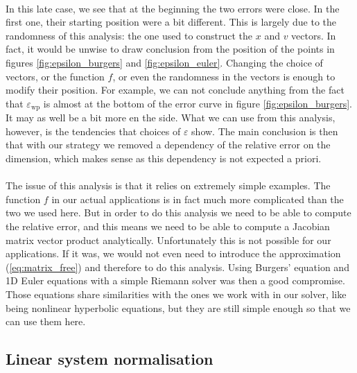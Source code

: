       \paragraph{}
      In this late case, we see that at the beginning the two errors were close.
      In the first one, their starting position were a bit different.
      This is largely due to the randomness of this analysis: the one used to construct the $x$ and $v$ vectors.
      In fact, it would be unwise to draw conclusion from the position of the points in figures \ref{fig:epsilon_burgers} and \ref{fig:epsilon_euler}.
      Changing the choice of vectors, or the function $f$, or even the randomness in the vectors is enough to modify their position.
      For example, we can not conclude anything from the fact that $\varepsilon_\textrm{wp}$ is almost at the bottom of the error curve in figure \ref{fig:epsilon_burgers}.
      It may as well be a bit more en the side.
      What we can use from this analysis, however, is the tendencies that choices of $\varepsilon$ show.
      The main conclusion is then that with our strategy we removed a dependency of the relative error on the dimension, which makes sense as this dependency is not expected a priori.

      \paragraph{}
      The issue of this analysis is that it relies on extremely simple examples.
      The function $f$ in our actual applications is in fact much more complicated than the two we used here.
      But in order to do this analysis we need to be able to compute the relative error, and this means we need to be able to compute a Jacobian matrix vector product analytically.
      Unfortunately this is not possible for our applications.
      If it was, we would not even need to introduce the approximation (\ref{eq:matrix_free}) and therefore to do this analysis.
      Using Burgers' equation and 1D Euler equations with a simple Riemann solver was then a good compromise.
      Those equations share similarities with the ones we work with in our solver, like being nonlinear hyperbolic equations, but they are still simple enough so that we can use them here.


    \subsection{Linear system normalisation}

